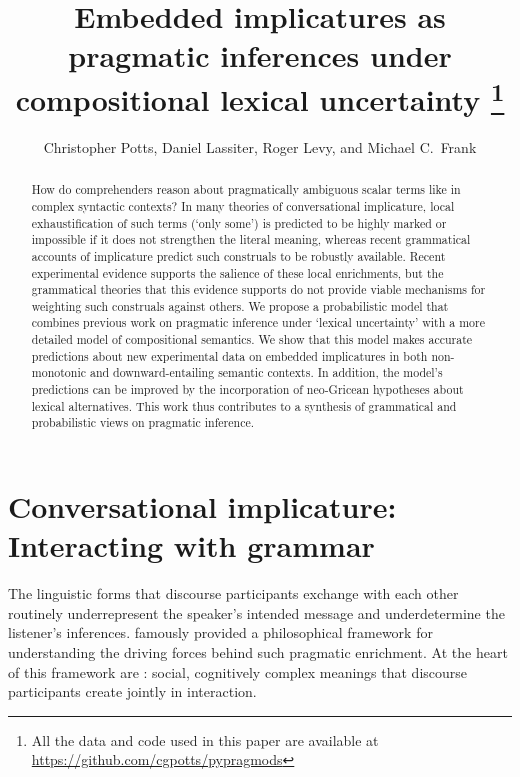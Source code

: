 \documentclass[leqno,12pt]{article}
\begin{document}

\title{Embedded implicatures as pragmatic inferences under compositional lexical uncertainty%
  \thanks{All the data and code used in this paper are available at \url{https://github.com/cgpotts/pypragmods}}}
\author{Christopher Potts, Daniel Lassiter, Roger Levy, and Michael C.~Frank}
\maketitle


\begin{abstract} 
  How do comprehenders reason about pragmatically ambiguous scalar
  terms like  in complex syntactic contexts?  In many
  theories of conversational implicature, local exhaustification of
  such terms (`only some') is predicted to be highly marked or
  impossible if it does not strengthen the literal meaning, whereas
  recent grammatical accounts of implicature predict such construals
  to be robustly available. Recent experimental evidence supports the
  salience of these local enrichments, but the grammatical theories
  that this evidence supports do not provide viable mechanisms for
  weighting such construals against others. We propose a probabilistic
  model that combines previous work on pragmatic inference under
  `lexical uncertainty' with a more detailed model of compositional
  semantics. We show that this model makes accurate predictions about
  new experimental data on embedded implicatures in both non-monotonic
  and downward-entailing semantic contexts. In addition, the model's
  predictions can be improved by the incorporation of neo-Gricean
  hypotheses about lexical alternatives. This work thus contributes to
  a synthesis of grammatical and probabilistic views on pragmatic
  inference.
\end{abstract}


\section{Conversational implicature: Interacting with grammar}\label{sec:introduction}

The linguistic forms that discourse participants exchange with each
other routinely underrepresent the speaker's intended message and
underdetermine the listener's inferences. \citet{Grice75} famously
provided a philosophical framework for understanding the driving
forces behind such pragmatic enrichment. At the heart of this
framework are : social, cognitively
complex meanings that discourse participants create jointly in
interaction.
\end{document}
